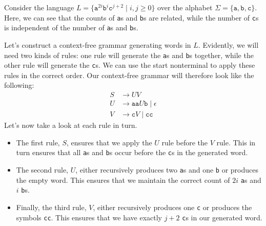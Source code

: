 \begin{example}
Consider the language $L = \{\texttt{a}^{2i}\texttt{b}^{i}\texttt{c}^{j+2} \mid i, j \geq 0\}$ over the alphabet $\Sigma = \{\texttt{a}, \texttt{b}, \texttt{c}\}$. Here, we can see that the counts of \texttt{a}s and \texttt{b}s are related, while the number of \texttt{c}s is independent of the number of \texttt{a}s and \texttt{b}s.

Let's construct a context-free grammar generating words in $L$. Evidently, we will need two kinds of rules: one rule will generate the \texttt{a}s and \texttt{b}s together, while the other rule will generate the \texttt{c}s. We can use the start nonterminal to apply these rules in the correct order. Our context-free grammar will therefore look like the following:
\begin{align*}
S	&\rightarrow UV \\
U	&\rightarrow \texttt{aa}U\texttt{b} \mid \epsilon \\
V	&\rightarrow \texttt{c}V \mid \texttt{cc}
\end{align*}
Let's now take a look at each rule in turn.
\begin{itemize}
\item The first rule, $S$, ensures that we apply the $U$ rule before the $V$ rule. This in turn ensures that all \texttt{a}s and \texttt{b}s occur before the \texttt{c}s in the generated word.
\item The second rule, $U$, either recursively produces two \texttt{a}s and one \texttt{b} or produces the empty word. This ensures that we maintain the correct count of $2i$ \texttt{a}s and $i$ \texttt{b}s.
\item Finally, the third rule, $V$, either recursively produces one \texttt{c} or produces the symbols \texttt{cc}. This ensures that we have exactly $j+2$ \texttt{c}s in our generated word.
\end{itemize}
\end{example}

